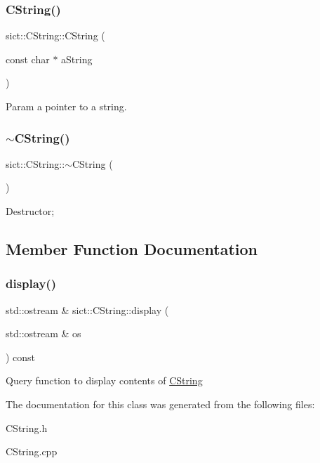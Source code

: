 \subsubsection{\texorpdfstring{C\+String()}{CString()}\hspace{0.1cm}{\footnotesize\ttfamily [2/2]}}
{\footnotesize\ttfamily sict\+::\+C\+String\+::\+C\+String (\begin{DoxyParamCaption}\item[{const char $\ast$}]{a\+String }\end{DoxyParamCaption})}

Param a pointer to a string. \mbox{\label{classsict_1_1CString_a2c70dcb73e626d0a80332cda1871d36d}} 
\subsubsection{\texorpdfstring{$\sim$\+C\+String()}{~CString()}}
{\footnotesize\ttfamily sict\+::\+C\+String\+::$\sim$\+C\+String (\begin{DoxyParamCaption}{ }\end{DoxyParamCaption})\hspace{0.3cm}{\ttfamily [virtual]}}

Destructor; 

\subsection{Member Function Documentation}
\mbox{\label{classsict_1_1CString_a4c4f39221992bb2076a11183e34b509c}} 
\subsubsection{\texorpdfstring{display()}{display()}}
{\footnotesize\ttfamily std\+::ostream \& sict\+::\+C\+String\+::display (\begin{DoxyParamCaption}\item[{std\+::ostream \&}]{os }\end{DoxyParamCaption}) const}

Query function to display contents of \mbox{\hyperlink{classsict_1_1CString}{C\+String}} 

The documentation for this class was generated from the following files\+:\begin{DoxyCompactItemize}
\item 
C\+String.\+h\item 
C\+String.\+cpp\end{DoxyCompactItemize}
